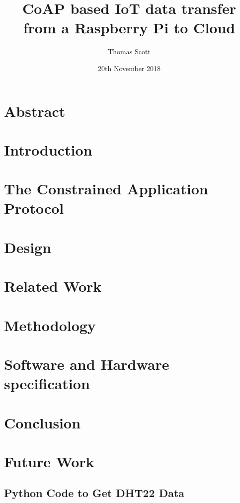 \documentclass[11pt]{article}
\title{CoAP based IoT data transfer from a Raspberry Pi to Cloud}
\author{Thomas Scott}
\date{20th November 2018}
\begin{document}
	\maketitle
	\newpage

	\section{Abstract}
	

	\section{Introduction}
	

	\section{The Constrained Application Protocol}
	

	\section{Design}
	

	\section{Related Work}
	

	\section{Methodology}
	

	\section{Software and Hardware specification}
	

	\section{Conclusion}
	

	\section{Future Work}
	

	\newpage
	\begin{appendices}
		
		\section{Python Code to Get DHT22 Data}
		
		
	\end{appendices}

	\newpage
	\printglossaries

	\newpage
	
	
\end{document}
